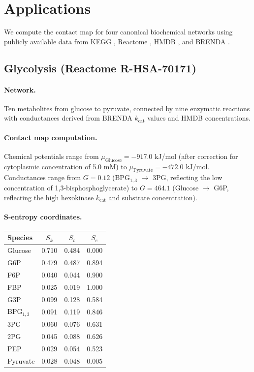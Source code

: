 \documentclass[11pt,twocolumn]{article}
\theoremstyle{plain}
\theoremstyle{definition}
\newcommand{\Sk}{S_k}
\newcommand{\St}{S_t}
\newcommand{\Se}{S_e}
\begin{document}
\section{Applications}
\label{sec:applications}

We compute the contact map for four canonical biochemical networks using
publicly available data from KEGG \cite{kanehisa2000kegg}, Reactome
\cite{jassal2020reactome}, HMDB \cite{wishart2018hmdb}, and BRENDA
\cite{schomburg2004brenda}.

\subsection{Glycolysis (Reactome R-HSA-70171)}

\paragraph{Network.} Ten metabolites from glucose to pyruvate, connected by
nine enzymatic reactions with conductances derived from BRENDA $k_{\text{cat}}$
values and HMDB concentrations.

\paragraph{Contact map computation.}
Chemical potentials range from $\mu_{\text{Glucose}} = -917.0$ kJ/mol (after
correction for cytoplasmic concentration of 5.0 mM) to
$\mu_{\text{Pyruvate}} = -472.0$ kJ/mol.
Conductances range from $G = 0.12$ (BPG$_{1,3}$ $\to$ 3PG, reflecting the
low concentration of 1,3-bisphosphoglycerate) to $G = 464.1$ (Glucose $\to$
G6P, reflecting the high hexokinase $k_{\text{cat}}$ and substrate
concentration).

\paragraph{S-entropy coordinates.}
\begin{center}
\begin{tabular}{lccc}
\toprule
Species & $\Sk$ & $\St$ & $\Se$ \\
\midrule
Glucose    & 0.710 & 0.484 & 0.000 \\
G6P        & 0.479 & 0.487 & 0.894 \\
F6P        & 0.040 & 0.044 & 0.900 \\
FBP        & 0.025 & 0.019 & 1.000 \\
G3P        & 0.099 & 0.128 & 0.584 \\
BPG$_{1,3}$ & 0.091 & 0.119 & 0.846 \\
3PG        & 0.060 & 0.076 & 0.631 \\
2PG        & 0.045 & 0.088 & 0.626 \\
PEP        & 0.029 & 0.054 & 0.523 \\
Pyruvate   & 0.028 & 0.048 & 0.005 \\
\bottomrule
\end{tabular}
\end{center}
\end{document}
